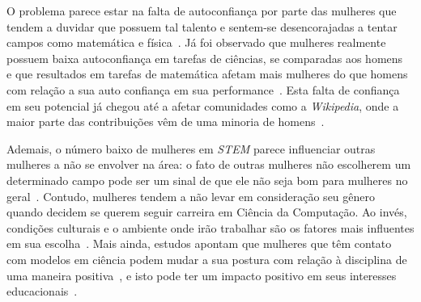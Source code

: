 O problema parece estar na falta de autoconfiança por parte das mulheres que tendem a duvidar que possuem tal talento e sentem-se desencorajadas a tentar campos como matemática e física~\cite{leslie2015expectations}. Já foi observado que mulheres realmente possuem baixa autoconfiança em tarefas de ciências, se comparadas aos homens~\cite{fox1992confidence} e que resultados em tarefas de matemática afetam mais mulheres do que homens com relação a sua auto confiança em sua performance~\cite{campbell1986effects}. Esta falta de confiança em seu potencial já chegou até a afetar comunidades como a \emph{Wikipedia}, onde a maior parte das contribuições vêm de uma minoria de homens~\cite{antin2011gender,lam2011wp}.

Ademais, o número baixo de mulheres em \emph{STEM} parece influenciar outras mulheres a não se envolver na área: o fato de outras mulheres não escolherem um determinado campo pode ser um sinal de que ele não seja bom para mulheres no geral~\cite{shapiro2011major}. Contudo, mulheres tendem a não levar em consideração seu gênero quando decidem se querem seguir carreira em Ciência da Computação. Ao invés, condições culturais e o ambiente onde irão trabalhar são os fatores mais influentes em sua escolha~\cite{blum2007cultural}. Mais ainda, estudos apontam que mulheres que têm contato com modelos em ciência podem mudar a sua postura com relação à disciplina de uma maneira positiva~\cite{smith1986effect}, e isto pode ter um impacto positivo em seus interesses educacionais~\cite{nixon1999educational}.




